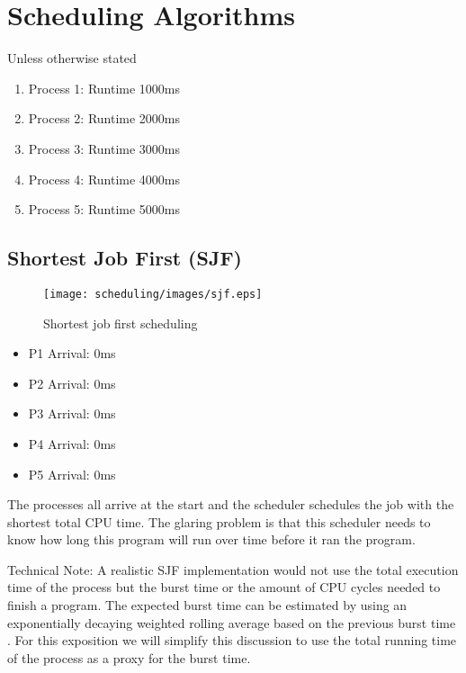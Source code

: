 \section{Scheduling Algorithms}

Unless otherwise stated

\begin{enumerate}
\item Process 1: Runtime 1000ms
\item Process 2: Runtime 2000ms
\item Process 3: Runtime 3000ms
\item Process 4: Runtime 4000ms
\item Process 5: Runtime 5000ms
\end{enumerate}

\subsection{Shortest Job First (SJF)}

\begin{figure}[htbp]
\centering
\texttt{[image: scheduling/images/sjf.eps]}
\caption{Shortest job first scheduling}
\end{figure}

\begin{itemize}
\tightlist
\item
  P1 Arrival: 0ms
\item
  P2 Arrival: 0ms
\item
  P3 Arrival: 0ms
\item
  P4 Arrival: 0ms
\item
  P5 Arrival: 0ms
\end{itemize}

The processes all arrive at the start and the scheduler schedules the job with the shortest total CPU time.
The glaring problem is that this scheduler needs to know how long this program will run over time before it ran the program.

Technical Note: A realistic SJF implementation would not use the total execution time of the process but the burst time or the amount of CPU cycles needed to finish a program.
The expected burst time can be estimated by using an exponentially decaying weighted rolling average based on the previous burst time \cite[Chapter 6]{silberschatz2005operating}.
For this exposition we will simplify this discussion to use the total running time of the process as a proxy for the burst time.

